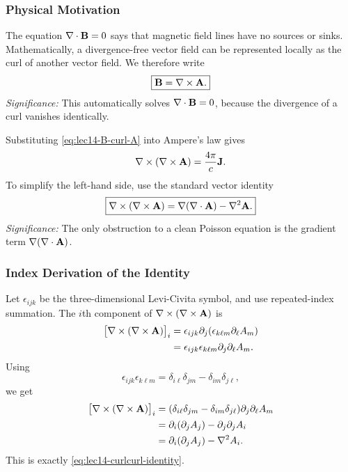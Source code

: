 \subsubsection*{Physical Motivation}
The equation $\nabla \cdot\mathbf{B}=0$ says that magnetic field lines have no sources or sinks.
Mathematically, a divergence-free vector field can be represented locally as the curl
of another vector field.  We therefore write
\begin{equation}\label{eq:lec14-B-curl-A}
  \boxed{\mathbf{B}=\nabla\times\mathbf{A}.}
\end{equation}
\textit{Significance:} This automatically solves $\nabla \cdot\mathbf{B}=0$, because the divergence
of a curl vanishes identically.

Substituting \eqref{eq:lec14-B-curl-A} into Ampere's law gives
\begin{equation}\label{eq:lec14-curlcurlA-equation}
  \nabla\times(\nabla\times\mathbf{A})=\frac{4\pi}{c}\mathbf{J} .
\end{equation}
To simplify the left-hand side, use the standard vector identity
\begin{equation}\label{eq:lec14-curlcurl-identity}
  \boxed{
    \nabla\times(\nabla\times\mathbf{A})
    = \nabla(\nabla \cdot\mathbf{A})-\nabla^2\mathbf{A} .
  }
\end{equation}
\textit{Significance:} The only obstruction to a clean Poisson equation is the
gradient term $\nabla(\nabla \cdot\mathbf{A})$.

\subsubsection*{Index Derivation of the Identity}
Let $\epsilon_{ijk}$ be the three-dimensional Levi-Civita symbol, and use repeated-index
summation.  The $i$th component of $\nabla\times(\nabla\times\mathbf{A})$ is
\begin{align}
  \bigl[\nabla\times(\nabla\times\mathbf{A})\bigr]_i
  &= \epsilon_{ijk}\partial_j(\epsilon_{k\ell m}\partial_\ell A_m) \notag\\
  &= \epsilon_{ijk}\epsilon_{k\ell m}\partial_j\partial_\ell A_m. \label{eq:lec14-curlcurl-index-start}
\end{align}
Using
\begin{equation}\label{eq:lec14-epsilon-contraction}
  \epsilon_{ijk}\epsilon_{k\ell m}
  = \delta_{i\ell}\delta_{jm}-\delta_{im}\delta_{j\ell},
\end{equation}
we get
\begin{align}
  \bigl[\nabla\times(\nabla\times\mathbf{A})\bigr]_i
  &= (\delta_{i\ell}\delta_{jm}-\delta_{im}\delta_{j\ell})
     \partial_j\partial_\ell A_m \notag\\
  &= \partial_i(\partial_j A_j)-\partial_j\partial_j A_i \notag\\
  &= \partial_i(\partial_j A_j)-\nabla^2 A_i. \label{eq:lec14-curlcurl-index-final}
\end{align}
This is exactly \eqref{eq:lec14-curlcurl-identity}.

